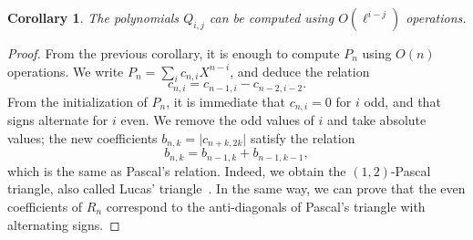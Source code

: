 \documentclass{sig-alternate}
\newtheorem{corollary}[definition]{Corollary}
\begin{document}
\begin{corollary}
  The polynomials $Q_{i,j}$ can be computed using $O(\ell^{i-j})$
  operations.
\end{corollary}
\begin{proof}
  From the previous corollary, it is enough to compute $P_n$ using
  $O(n)$ operations. We write $P_n = \sum_i c_{n,i}X^{n-i}$, and deduce the
  relation
  \begin{equation}
    c_{n,i} = c_{n-1,i} - c_{n-2,i-2}.
  \end{equation}
  From the initialization of $P_n$, it is immediate that $c_{n,i}=0$
  for $i$ odd, and that signs alternate for $i$ even. We remove the
  odd values of $i$ and take absolute values; the new coefficients
  $b_{n,k}=\lvert c_{n+k,2k}\rvert$ satisfy the relation
  \begin{equation*}
    b_{n,k} = b_{n-1,k} + b_{n-1,k-1},
  \end{equation*}
  which is the same as Pascal's relation. Indeed, we obtain the
  $(1,2)$-Pascal triangle, also called Lucas'
  triangle~\cite{benjamin10}.
  In the same way, we can prove that the even coefficients of $R_n$
  correspond to the anti-diagonals of Pascal's triangle with
  alternating signs.
  

\end{proof}
\end{document}

